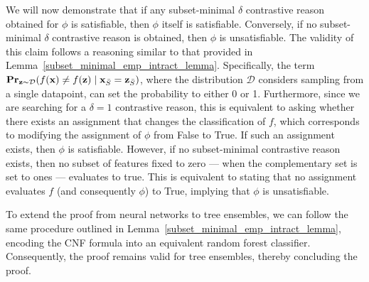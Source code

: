 \documentclass{article}
\newcommand{\z}{\textbf{z}}
\newcommand{\x}{\textbf{x}}
\begin{document}
We will now demonstrate that if any subset-minimal $\delta$ contrastive reason obtained for $\phi$ is satisfiable, then $\phi$ itself is satisfiable. Conversely, if no subset-minimal $\delta$ contrastive reason is obtained, then $\phi$ is unsatisfiable. The validity of this claim follows a reasoning similar to that provided in Lemma~\ref{subset_minimal_emp_intract_lemma}. Specifically, the term $\mathbf{Pr}_{\z\sim\mathcal{D}}(f(\x)\neq f(\z) \mid \x_{\Bar{S}}=\z_{\Bar{S}})$, where the distribution $\mathcal{D}$ considers sampling from a single datapoint, can set the probability to either 0 or 1. Furthermore, since we are searching for a $\delta=1$ contrastive reason, this is equivalent to asking whether there exists an assignment that changes the classification of $f$, which corresponds to modifying the assignment of $\phi$ from False to True. If such an assignment exists, then $\phi$ is satisfiable. However, if no subset-minimal contrastive reason exists, then no subset of features fixed to zero --- when the complementary set is set to ones --- evaluates to true. This is equivalent to stating that no assignment evaluates $f$ (and consequently $\phi$) to True, implying that $\phi$ is unsatisfiable.


To extend the proof from neural networks to tree ensembles, we can follow the same procedure outlined in Lemma~\ref{subset_minimal_emp_intract_lemma}, encoding the CNF formula into an equivalent random forest classifier. Consequently, the proof remains valid for tree ensembles, thereby concluding the proof.
\end{document}
